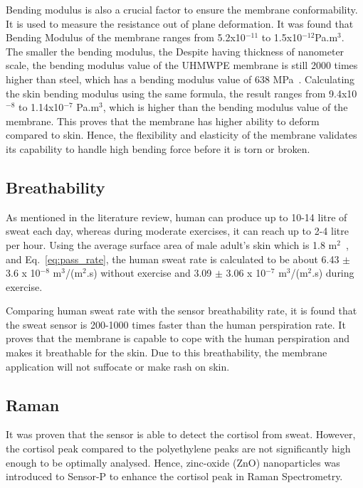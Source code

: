 \documentclass[journal]{IEEEtran}
\begin{document}
Bending modulus is also a crucial factor to ensure the membrane conformability. It is used to measure the resistance out of plane deformation. It was found that Bending Modulus of the membrane ranges from 5.2x10$^{-11}$ to 1.5x10$^{-12}$Pa.m$^3$. The smaller the bending modulus, the  Despite having thickness of nanometer scale, the bending modulus value of the UHMWPE membrane is still 2000 times higher than steel, which has a bending modulus value of 638 MPa~\cite{SheerStrength}. Calculating the skin bending modulus using the same formula, the result ranges from 9.4x10$^{-8}$ to 1.14x10$^{-7}$ Pa.m$^3$, which is higher than the bending modulus value of the membrane. This proves that the membrane has higher ability to deform compared to skin. Hence, the flexibility and elasticity of the membrane validates its capability to handle high bending force before it is torn or broken. 

\subsection{Breathability}

As mentioned in the literature review, human can produce up to 10-14 litre of sweat each day, whereas during moderate exercises, it can reach up to 2-4 litre per hour. Using the average surface area of male adult’s skin which is 1.8 m$^2$~\cite{BenderDict}, and Eq.~\ref{eq:pass_rate}, the human sweat rate is calculated to be about 6.43 $\pm$ 3.6 x 10$^{-8}$ m$^3$/(m$^2$.s) without exercise and 3.09 $\pm$ 3.06 x 10$^{-7}$ m$^3$/(m$^2$.s) during exercise.  

Comparing human sweat rate with the sensor breathability rate, it is found that the sweat sensor is 200-1000 times faster than the human perspiration rate. It proves that the membrane is capable to cope with the human perspiration and makes it breathable for the skin. Due to this breathability, the membrane application will not suffocate or make rash on skin.

\subsection{Raman}

It was proven that the sensor is able to detect the cortisol from sweat. However, the cortisol peak compared to the polyethylene peaks are not significantly high enough to be optimally analysed. Hence, zinc-oxide (ZnO) nanoparticles was introduced to Sensor-P to enhance the cortisol peak in Raman Spectrometry. 
\end{document}
